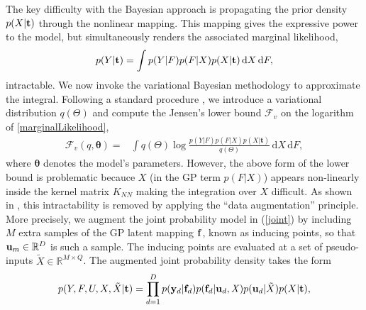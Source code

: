 \documentclass{article} %
\begin{document}
The key difficulty with the Bayesian approach is propagating the prior
density $p(X|\mathbf{t})$ through the nonlinear mapping. This
mapping gives the expressive power to the model, but simultaneously
renders the associated marginal
likelihood,
\begin{equation}
\label{marginalLikelihood}
p(Y | \mathbf{t}) =  \int p( Y | F) p(F | X ) p(X | \mathbf{t}) \, \mathrm{d} X \,\mathrm{d}F,
\end{equation}
intractable. We now invoke the variational Bayesian methodology
to approximate the integral. Following a standard procedure \cite{bishop}, we introduce a variational distribution
$q(\Theta)$ and compute the Jensen's lower bound $\mathcal{F}_v$ on the logarithm of \eqref{marginalLikelihood},
%
\begin{align}
\mathcal{F}_v(q, \boldsymbol \theta) = {}& \int q(\mathit{\Theta}) \log 
		\frac{ p(Y | F) p(F | X ) p(\mathit{X} | \mathbf{t})}
			 {q(\mathit{\Theta})}  \, \mathrm{d} X \,\mathrm{d}F,
		 \label{jensens1}
\end{align}
%
%
where $\boldsymbol \theta$ denotes the model's parameters. 
However, the above form of the lower bound is problematic becauce 
$X$ (in the GP term $p(F|X)$) appears non-linearly inside the kernel
matrix $K_{NN}$ making the integration over $X$ difficult. As shown  
in \cite{BayesianGPLVM}, this intractability is removed by 
applying the ``data augmentation'' principle. 
More precisely, we  augment the joint probability
model in (\ref{joint}) 
by including $M$ extra samples of the GP latent mapping $\mathbf{f}$, 
known as inducing points, so that  $\mathbf{u}_m \in \mathbb{R}^D$
is such a sample. The inducing points are evaluated at a set of
pseudo-inputs $\tilde{X} \in \mathbb{R}^{M \times Q}$. %
The augmented joint probability density takes the form
\begin{equation}
 \label{augmentedJoint}
p(Y,F, U,X,\tilde{X} | \mathbf{t}) = \prod_{d=1}^D p(\mathbf{y}_d | \mathbf{f}_d) p(\mathbf{f}_d | \mathbf{u}_d, \mathit{X})
p(\mathbf{u}_d | \tilde{X})  p(X | \mathbf{t}),
\end{equation}
\end{document}
